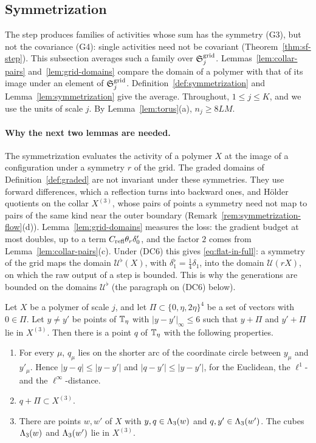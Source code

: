 \subsection{Symmetrization}\label{subsec:gen-symmetrization}

The step produces families of activities whose sum has the symmetry (G3), but not the covariance (G4): single activities need not be covariant (Theorem~\ref{thm:sf-step}). This subsection averages such a family over $\mathfrak S^{\rm grid}_j$. Lemmas~\ref{lem:collar-pairs} and~\ref{lem:grid-domains} compare the domain of a polymer with that of its image under an element of $\mathfrak S^{\rm grid}_j$. Definition~\ref{def:symmetrization} and Lemma~\ref{lem:symmetrization} give the average. Throughout, $1\le j\le K$, and we use the units of scale $j$. By Lemma~\ref{lem:torus}(a), $n_j\ge8LM$.

\paragraph{Why the next two lemmas are needed.} The symmetrization evaluates the activity of a polymer $X$ at the image of a configuration under a symmetry $r$ of the grid. The graded domains of Definition~\ref{def:graded} are not invariant under these symmetries. They use forward differences, which a reflection turns into backward ones, and H\"older quotients on the collar $X^{(3)}$, whose pairs of points a symmetry need not map to pairs of the same kind near the outer boundary (Remark~\ref{rem:symmetrization-flow}(d)). Lemma~\ref{lem:grid-domains} measures the loss: the gradient budget at most doubles, up to a term $C_{\rm refl}\theta_r\delta'_0$, and the factor $2$ comes from Lemma~\ref{lem:collar-pairs}(c). Under (DC6) this gives \eqref{eq:flat-in-full}: a symmetry of the grid maps the domain $\mathcal U^\flat(X)$, with $\delta_1^\flat=\frac14\delta_1$, into the domain $\mathcal U(rX)$, on which the raw output of a step is bounded. This is why the generations are bounded on the domains $\mathcal U^\flat$ (the paragraph on (DC6) below).

\begin{lemma}\label{lem:collar-pairs}
Let $X$ be a polymer of scale $j$, and let $\Pi\subset\{0,\eta,2\eta\}^4$ be a set of vectors with $0\in\Pi$. Let $y\ne y'$ be points of $\mathbb T_\eta$ with $|y-y'|_\infty\le6$ such that $y+\Pi$ and $y'+\Pi$ lie in $X^{(3)}$. Then there is a point $q$ of $\mathbb T_\eta$ with the following properties.
\begin{enumerate}[label=(\alph*)]
\item For every $\mu$, $q_\mu$ lies on the shorter arc of the coordinate circle between $y_\mu$ and $y'_\mu$. Hence $|y-q|\le|y-y'|$ and $|q-y'|\le|y-y'|$, for the Euclidean, the $\ell^1$- and the $\ell^\infty$-distance.
\item $q+\Pi\subset X^{(3)}$.
\item There are points $w,w'$ of $X$ with $y,q\in\Lambda_3(w)$ and $q,y'\in\Lambda_3(w')$. The cubes $\Lambda_3(w)$ and $\Lambda_3(w')$ lie in $X^{(3)}$.
\end{enumerate}
\end{lemma}

